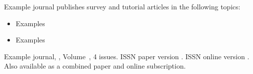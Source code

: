 \journalurl        {}



\journalaimsandscope
 {%
 Example journal publishes
 survey and tutorial articles in the following topics:
 \begin{itemize}
 \item Examples
 \item Examples
 \end{itemize}%
 }


\journallibraryinfo
 {%
  Example journal, ,
  Volume~, 4 issues.
  ISSN paper version .
  ISSN online version .
  Also available as a combined paper and online
  subscription.
 } 